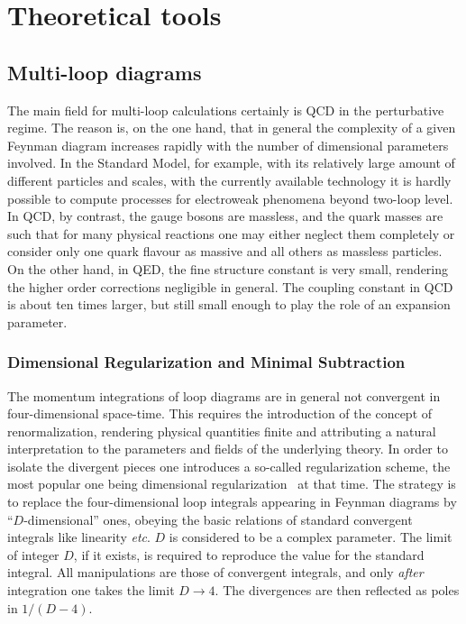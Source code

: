 %
\section{Theoretical tools\label{sec:tools}}

\subsection{Multi-loop diagrams}\label{secmultiloop}
%
The main field for multi-loop calculations certainly is QCD in the
perturbative regime. The reason is, on the one hand, that in general the
complexity of a given Feynman diagram increases rapidly with the number
of dimensional parameters involved.  In the Standard Model, for example, with
its relatively large amount of different particles and scales, with the
currently available technology it is hardly possible to compute
processes for electroweak phenomena beyond two-loop level. In QCD, by
contrast, the gauge bosons are massless, and the quark masses are such
that for many physical reactions one may either neglect them completely
or consider only one quark flavour as massive and all others as massless
particles.  On the other hand, in QED, the fine structure constant is
very small, rendering the higher order corrections negligible in
general.  The coupling constant in QCD is about ten times larger, but
still small enough to play the role of an expansion parameter.


\subsubsection{Dimensional Regularization and Minimal Subtraction}
%
The momentum integrations of loop diagrams are in general not convergent
in four-dimensional space-time.  This requires the introduction of the
concept of renormalization, rendering physical quantities finite and
attributing a natural interpretation to the parameters and fields of the
underlying theory.  In order to isolate the divergent pieces one
introduces a so-called regularization scheme, the most popular one being
dimensional regularization~\cite{tHoVel72} at that time. The strategy is
to replace the four-dimensional loop integrals appearing in Feynman
diagrams by ``$D$-dimensional'' ones, obeying the basic relations of
standard convergent integrals like linearity {\it etc}.  $D$ is
considered to be a complex parameter. The limit of integer $D$, if it
exists, is required to reproduce the value for the standard integral.
All manipulations are those of convergent integrals, and only {\it
  after} integration one takes the limit $D\to 4$.  The divergences are
then reflected as poles in $1/(D-4)$.

